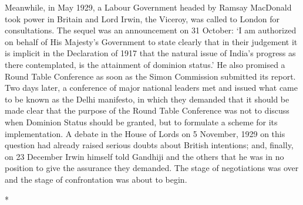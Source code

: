 \begin{multicols}{2}
Meanwhile, in May 1929, a Labour Government headed by Ramsay MacDonald took power in Britain and Lord Irwin, the Viceroy, was called to London for consultations. The sequel was an announcement on 31 October: `I am authorized on behalf of His Majesty's Government to state clearly that in their judgement it is implicit in the Declaration of 1917 that the natural issue of India's progress as there contemplated, is the attainment of dominion status.' He also promised a Round Table Conference as soon as the Simon Commission submitted its report. Two days later, a conference of major national leaders met and issued what came to be known as the Delhi manifesto, in which they demanded that it should be made clear that the purpose of the Round Table Conference was not to discuss when Dominion Status should be granted, but to formulate a scheme for its implementation. A debate in the House of Lords on 5 November, 1929 on this question had already raised serious doubts about British intentions; and, finally, on 23 December Irwin himself told Gandhiji and the others that he was in no position to give the assurance they demanded. The stage of negotiations was over and the stage of confrontation was about to begin.

\begin{center}*\end{center}

\paragraph*{}


\end{multicols}
